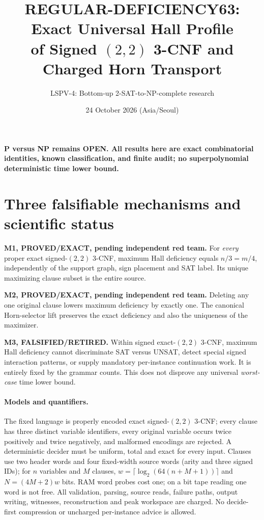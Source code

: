 \documentclass[11pt]{article}
\title{REGULAR-DEFICIENCY63: Exact Universal Hall Profile\\of Signed $(2,2)$ 3-CNF and Charged Horn Transport}
\author{LSPV-4: Bottom-up 2-SAT-to-NP-complete research}
\date{24 October 2026 (Asia/Seoul)}
\begin{document}
\maketitle
\begin{center}\textbf{P versus NP remains OPEN. All results here are exact combinatorial identities, known classification, and finite audit; no superpolynomial deterministic time lower bound.}\end{center}

\section{Three falsifiable mechanisms and scientific status}
\noindent\textbf{M1, PROVED/EXACT, pending independent red team.}
For \emph{every} proper exact signed-$(2,2)$ 3-CNF, maximum Hall deficiency equals $n/3=m/4$, independently of the support graph, sign placement and SAT label. Its unique maximizing clause subset is the entire source.
\par\noindent\textbf{M2, PROVED/EXACT, pending independent red team.}
Deleting any one original clause lowers maximum deficiency by exactly one. The canonical Horn-selector lift preserves the exact deficiency and also the uniqueness of the maximizer.
\par\noindent\textbf{M3, FALSIFIED/RETIRED.}
Within signed exact-$(2,2)$ 3-CNF, maximum Hall deficiency cannot discriminate SAT versus UNSAT, detect special signed interaction patterns, or supply mandatory per-instance continuation work. It is entirely fixed by the grammar counts. This does not disprove any universal \emph{worst-case} time lower bound.
\paragraph{Models and quantifiers.}
The fixed language is properly encoded exact signed-$(2,2)$ 3-CNF; every clause has three distinct variable identifiers, every original variable occurs twice positively and twice negatively, and malformed encodings are rejected. A deterministic decider must be uniform, total and exact for every input. Clauses use two header words and four fixed-width source words (arity and three signed IDs); for $n$ variables and $M$ clauses, $w=\lceil\log_2(64(n+M+1))\rceil$ and $N=(4M+2)w$ bits. RAM word probes cost one; on a bit tape reading one word is not free. All validation, parsing, source reads, failure paths, output writing, witnesses, reconstruction and peak workspace are charged. No decide-first compression or uncharged per-instance advice is allowed.
\end{document}
